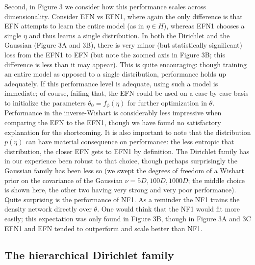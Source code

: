 \documentclass[twoside]{article}
\begin{document}
%
Second, in Figure 3 we consider how this performance scales across dimensionality.  Consider EFN vs EFN1, where again the only difference is that EFN attempts to learn the entire model (as in $\eta \in H$), whereas EFN1 chooses a single $\eta$ and thus learns a single distribution.  In both the Dirichlet and the Gaussian (Figure 3A and 3B), there is very minor (but statistically significant) loss from the EFN1 to EFN (but note the zoomed axis in Figure 3B; this difference is less than it may appear).  This is quite encouraging: though training an entire model as opposed to a single distribution, performance holds up adequately.  If this performance level is adequate, using such a model is immediate; of course, failing that, the EFN could be used on a case by case basis to initialize the parameters $\theta_0 = f_\phi(\eta)$ for further optimization in $\theta$.  Performance in the inverse-Wishart is considerably less impressive when comparing the EFN to the EFN1, though we have found no satisfactory explanation for the shortcoming.  It is also important to note that the distribution $p(\eta)$ can have material consequence on performance: the less entropic that distribution, the closer EFN gets to EFN1 by definition.  The Dirichlet family has in our experience been robust to that choice, though perhaps surprisingly the Gaussian family has been less so (we swept the degrees of freedom of a Wishart prior on the covariance of the Gaussian $\nu=5D, 100D, 1000D$; the middle choice is shown here, the other two having very strong and very poor performance).  Quite surprising is the performance of NF1.  As a reminder the NF1 trains the density network directly over $\theta$.  One would think that the NF1 would fit more easily; this expectation was only found in Figure 3B, though in Figure 3A and 3C EFN1 and EFN tended to outperform and scale better than NF1.  

\subsection{The hierarchical Dirichlet family}

%
\end{document}

